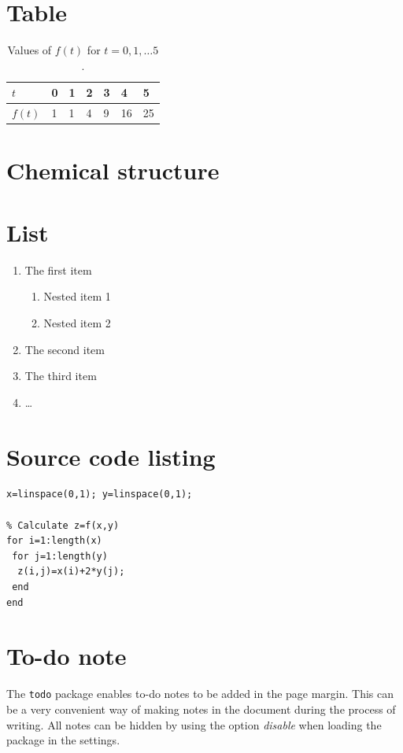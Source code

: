 \section{Table}
\begin{table}[H]
\centering
\caption{Values of $f(t)$ for $t=0,1,\dots 5$.}
\begin{tabular}{l|llllll} \hline\hline
$t$ & 0 & 1 & 2 & 3 & 4 & 5 \\ \hline
$f(t)$ & 1 & 1 & 4 & 9 & 16 & 25 \\ \hline\hline
\end{tabular}
\end{table}

\section{Chemical structure}
\begin{center}
\end{center}

\section{List}
\begin{enumerate}
  \item The first item
  \begin{enumerate}
    \item Nested item 1
    \item Nested item 2
  \end{enumerate}
  \item The second item
  \item The third item 
  \item \dots
\end{enumerate}

\section{Source code listing}
\begin{lstlisting}[frame=single]
% Generate x- and y-nodes
x=linspace(0,1); y=linspace(0,1);

% Calculate z=f(x,y)
for i=1:length(x)
 for j=1:length(y)
  z(i,j)=x(i)+2*y(j);
 end
end
\end{lstlisting}

\section{To-do note}
The \texttt{todo} package enables to-do notes to be added in the page margin. This can be a very convenient way of making notes in the document during the process of writing. All notes can be hidden by using the option \emph{disable} when loading the package in the settings. 

